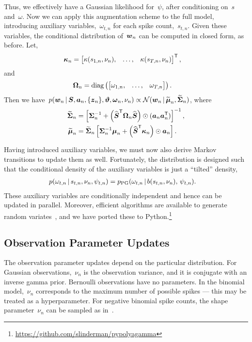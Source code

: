 Thus, we effectively have a Gaussian likelihood for~$\psi$, after conditioning 
on~$s$ and~$\omega$. Now we can apply this augmentation scheme to the full
model, introducing auxiliary variables,~$\omega_{t,n}$ for each spike count,~$s_{t,n}$.
Given these variables, the conditional distribution of~$\boldsymbol{w}_n$ can be computed in closed form,
as before. Let,
\begin{align*}
  \boldsymbol{\kappa}_n
  &= \begin{bmatrix} \kappa(s_{1,n}, \nu_n), &\ldots, &\kappa(s_{T,n}, \nu_n)
  \end{bmatrix}^{\mathsf{T}},
\end{align*}
and
\begin{align*}
  \boldsymbol{\Omega}_n &= \mathrm{diag} \left(
  \begin{bmatrix}
    \omega_{1,n}, & \ldots, & \omega_{T,n}
  \end{bmatrix}
  \right).
\end{align*}
Then we have~$
  p(\boldsymbol{w}_n \,|\, \boldsymbol{S}, \boldsymbol{a}_n, \{\boldsymbol{z}_n\}, \boldsymbol{\vartheta}, \boldsymbol{\omega}_n, \nu_n)
  \propto \mathcal{N}(\boldsymbol{w}_n \,|\, \widetilde{\boldsymbol{\mu}}_n, \widetilde{\boldsymbol{\Sigma}}_n)$,
where
\begin{align*}
  \widetilde{\boldsymbol{\Sigma}}_n &= \left[ \boldsymbol{\Sigma}_n^{-1} +
  \left(\widehat{\boldsymbol{S}}^{\mathsf{T}} \boldsymbol{\Omega}_n \widehat{\boldsymbol{S}} \right) \odot (\boldsymbol{a}_n \boldsymbol{a}_n^{\mathsf{T}}) \right]^{-1}, \\
  \widetilde{\boldsymbol{\mu}}_n &= \widetilde{\boldsymbol{\Sigma}}_n \left[ \boldsymbol{\Sigma}_n^{-1} \boldsymbol{\mu}_n +
  \left(\widehat{\boldsymbol{S}}^{\mathsf{T}} \boldsymbol{\kappa}_n \right) \odot \boldsymbol{a}_n \right].
\end{align*}

Having introduced auxiliary variables, we must now also derive
Markov transitions to update them as well. Fortunately, the
\polyagamma distribution is designed such that the conditional
density of the auxiliary variables is just a ``tilted'' \polyagamma
density,
\begin{align*}
  p(\omega_{t,n} \,|\, s_{t,n}, \nu_n, \psi_{t,n})
  &= p_{\mathrm{PG}}(\omega_{t,n} \,|\, b(s_{t,n}, \nu_n), \, \psi_{t,n}).
\end{align*}
These auxiliary variables are conditionally independent and hence can
be updated in parallel. Moreover, efficient algorithms are available
to generate \polyagamma random variates~\citep{windle2014sampling}, and
we have ported these to Python.\footnote{\url{https://github.com/slinderman/pypolyagamma}}

\subsection{Observation Parameter Updates}
The observation parameter updates depend on the particular distribution.
For Gaussian observations,~$\nu_n$ is the observation variance, and
it is conjugate with an inverse gamma prior.
Bernoulli observations have no parameters.
In the binomial model,~$\nu_n$ corresponds to the maximum number of
possible spikes --- this may be treated as a hyperparameter.
For negative binomial spike counts, the shape parameter~$\nu_n$ can
be sampled as in~\citep{Zhou2012}.


